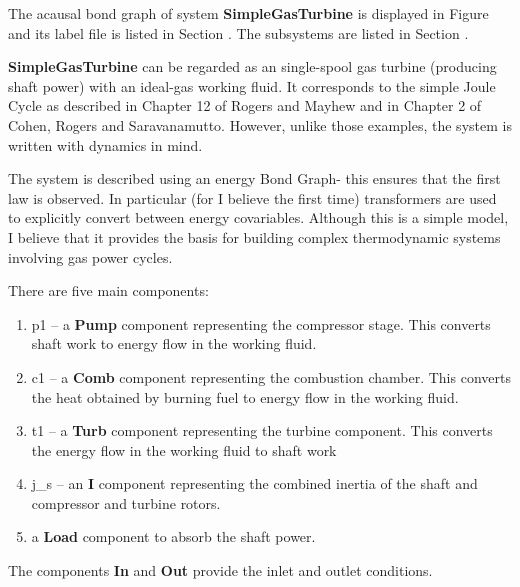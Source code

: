 

   The acausal bond graph of system \textbf{SimpleGasTurbine} is
   displayed in Figure  and its label
   file is listed in Section .
   The subsystems are listed in Section .
   
   \textbf{SimpleGasTurbine} can be regarded as an single-spool gas
   turbine (producing shaft power) with an ideal-gas working fluid. It
   corresponds to the simple Joule Cycle as described in Chapter 12 of
   Rogers and Mayhew and in Chapter 2 of Cohen, Rogers and
   Saravanamutto. However, unlike those examples, the system is
   written with dynamics in mind.

The system is described using an energy Bond Graph- this ensures
that the first law is observed. In particular (for I believe the first
time) transformers are used to explicitly convert between energy
covariables. Although this is a simple model, I believe that it
provides the basis for building complex thermodynamic systems
involving gas power cycles.


There are five main components:
\begin{enumerate}
\item p1 -- a \textbf{Pump} component representing the compressor
  stage. This converts shaft work to energy flow in the working fluid.
\item c1 -- a \textbf{Comb} component representing the combustion
  chamber. This converts the heat obtained by burning fuel to energy
  flow in the working fluid.
\item t1 -- a \textbf{Turb} component representing the turbine
  component. This converts the energy flow in the working fluid to
  shaft work
\item j\_s -- an \textbf{I} component representing the combined inertia
  of the shaft and compressor and turbine rotors.
\item a \textbf{Load} component to absorb the shaft power.
\end{enumerate}
The components \textbf{In} and \textbf{Out} provide the inlet and
outlet conditions.

